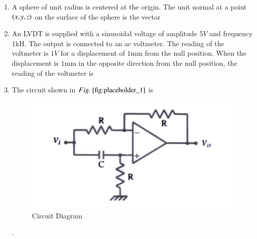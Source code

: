 \documentclass[journal,12pt,onecolumn]{IEEEtran}
\theoremstyle{remark}
\begin{document}
\begin{enumerate}
\item A sphere of unit radius is centered at the origin. The unit normal at a point $\left(x,y,z\right)$ on the surface of the sphere is the vector \par \hfill{}
\begin{enumerate}
\end{enumerate}


 
\item An LVDT is supplied with a sinusoidal voltage of amplitude $5V$ and frequency $1\text{kH}$. The output is connected to an ac voltmeter. The reading of the voltmeter is $1V$ for a displacement of $1\text{mm}$ from the null position. When the displacement is $1\text{mm}$ in the opposite direction from the null position, the reading of the voltmeter is \par \hfill{}
\begin{enumerate}
\end{enumerate}

 
\item The circuit shown in $\figref{fig:placeholder_1}$ is
\begin{figure}[H]
    \centering
    \includegraphics[width=0.3\columnwidth]{Figs/Q-6.jpg}
    \caption{Circuit Diagram}
    \label{fig:placeholder_1}
\end{figure}
. \hfill{}
\begin{enumerate}
\end{enumerate}


\end{enumerate}
\end{document}

